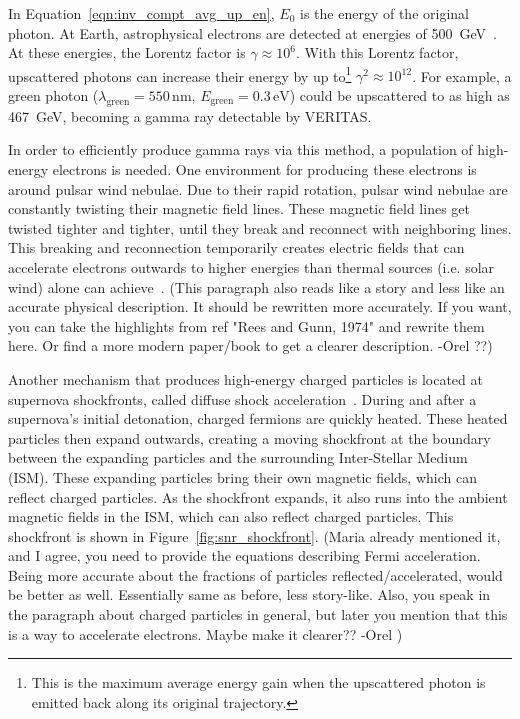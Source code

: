   
  In Equation~\ref{eqn:inv_compt_avg_up_en}, $E_{0}$ is the energy of the original photon.
  At Earth, astrophysical electrons are detected at energies of \SI{500}{GeV}~\cite{500GeVElectrons}.
  At these energies, the Lorentz factor is $\gamma\approx{}10^6$.
  With this Lorentz factor, upscattered photons can increase their energy by up to\footnote{This is the maximum average energy gain when the upscattered photon is emitted back along its original trajectory.} $\gamma^{2}\approx{}10^{12}$.
  For example, a green photon ($\lambda_{\textrm{green}}=550\,\textrm{nm}$, $E_{\textrm{green}}=0.3\,\textrm{eV}$) could be upscattered to as high as \SI{467}{GeV}, becoming a gamma ray detectable by VERITAS.
  
  In order to efficiently produce gamma rays via this method, a population of high-energy electrons is needed.
  One environment for producing these electrons is around pulsar wind nebulae.
  Due to their rapid rotation, pulsar wind nebulae are constantly twisting their magnetic field lines.
  These magnetic field lines get twisted tighter and tighter, until they break and reconnect with neighboring lines.
  This breaking and reconnection temporarily creates electric fields that can accelerate electrons outwards to higher energies than thermal sources (i.e. solar wind) alone can achieve~\cite{gamma_pwn1,gamma_pwn2}.
  {\color{red}(This paragraph also reads like a story and less like an accurate physical description. It should be rewritten more accurately. If you want, you can take the highlights from ref "Rees and Gunn, 1974" and rewrite them here. Or find a more modern paper/book to get a clearer description. -Orel ??)}

  Another mechanism that produces high-energy charged particles is located at supernova shockfronts, called diffuse shock acceleration~\cite{dsa1,dsa2,dsa3,dsa4,dsa5}.
  During and after a supernova's initial detonation, charged fermions are quickly heated.
  These heated particles then expand outwards, creating a moving shockfront at the boundary between the expanding particles and the surrounding Inter-Stellar Medium (ISM).
  These expanding particles bring their own magnetic fields, which can reflect charged particles.
  As the shockfront expands, it also runs into the ambient magnetic fields in the ISM, which can also reflect charged particles.
  This shockfront is shown in Figure~\ref{fig:snr_shockfront}.
  {\color{red}(Maria already mentioned it, and I agree, you need to provide the equations describing Fermi acceleration. Being more accurate about the fractions of particles reflected/accelerated, would be better as well. Essentially same as before, less story-like. Also, you speak in the paragraph about charged particles in general, but later you mention that this is a way to accelerate electrons. Maybe make it clearer?? -Orel )}
  
